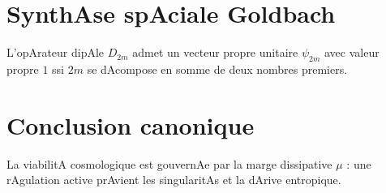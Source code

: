 \documentclass[12pt,a4paper]{article}
\begin{document}
\section{SynthAse spAciale Goldbach} 
L'opArateur dipAle $D_{2m}$ admet un vecteur propre unitaire $\psi_{2m}$ avec valeur propre $1$ ssi $2m$ se dAcompose en somme de deux nombres premiers.

\section{Conclusion canonique} 
La viabilitA cosmologique est gouvernAe par la marge dissipative $\mu$ : une rAgulation active prAvient les singularitAs et la dArive entropique.

\bigskip 
{}
\end{document}
